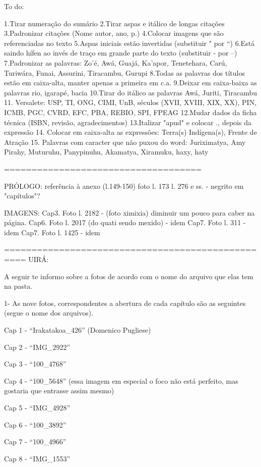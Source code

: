 To do:

1.Tirar numeração do sumário
2.Tirar aspas e itálico de longas citações
3.Padronizar citações (Nome autor, ano, p.)
4.Colocar imagens que são referenciadas no texto
5.Aspas iniciais estão invertidas (substituir " por ``)
6.Está saindo hífen ao invés de traço em grande parte do texto (substituir - por --)
7.Padronizar as palavras: Zo'é, Awá, Guajá, Ka'apor, Tenetehara, Carú, Turiwára, Funai, Assurini, Tiracambu, Gurupi
8.Todas as palavras dos títulos estão em caixa-alta, manter apenas a primeira em c.a.
9.Deixar em caixa-baixa as palavras rio, igarapé, bacia
10.Tirar do itálico as palavras Awá, Juriti, Tiracambu
11. Versalete: USP, TI, ONG, CIMI, UnB, séculos (XVII, XVIII, XIX, XX), PIN, ICMB, PGC, CVRD, EFC, PBA, REBIO, SPI, FPEAG 
12.Mudar dados da ficha técnica (ISBN, revisão, agradecimentos)
13.Italizar "apud" e colocar ., depois da expressão
14. Colocar em caixa-alta as expressões: Terra(s) Indígena(s), Frente de Atração
15. Palavras com caracter que não puxou do word: Juriximatya, Amy Pirahy, Muturuhu, Panypinuhu, Akamatya, Xiramuku, haxy, haty

====================================

PRÓLOGO: referência à anexo (l.149-150)
		 foto l. 173
		 l. 276 e ss. - negrito em "capítulos"?

IMAGENS: Cap3. Foto l. 2182 - (foto ximixia) diminuir um pouco para caber na página.
		 Cap6. Foto l. 2017 (do quati sendo mexido) - idem
		 Cap7. Foto l. 311 - idem
		 Cap7. Foto l. 1425 - idem
		 


==================================================
UIRÁ:

A seguir te informo sobre a fotos de acordo com o nome do arquivo que elas tem na pasta.

1- As nove fotos, correspondentes a abertura de cada capítulo são as seguintes (segue o nome dos arquivos).

Cap 1 - “Irakatakoa_426” (Domenico Pugliese)

Cap 2 -  “IMG_2922”

Cap 3 - “100_4768”

Cap 4 - “100_5648” (essa imagem em especial o foco não está perfeito, mas gostaria que entrasse assim mesmo)

Cap 5 -  “IMG_4928”

Cap 6 - “100_3892”

Cap 7 - “100_4966”

Cap 8 - “IMG_1553”


